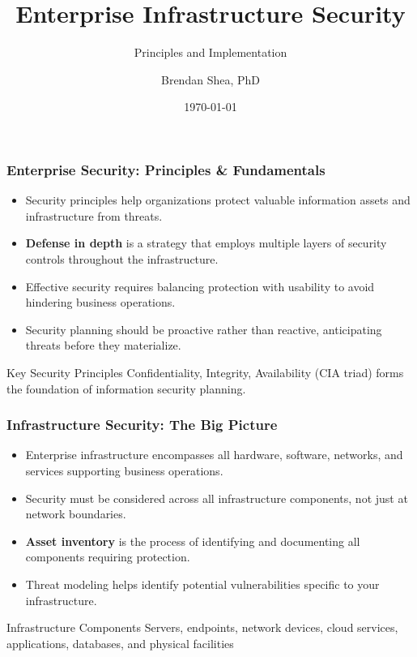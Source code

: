 \documentclass{beamer}
\title{Enterprise Infrastructure Security}
\subtitle{Principles and Implementation}
\author{Brendan Shea, PhD}
\date{\today}
\begin{document}
\begin{frame}
    \titlepage
\end{frame}

\begin{frame}
    \frametitle{Enterprise Security: Principles \& Fundamentals}
    \begin{itemize}
        \item Security principles help organizations protect valuable information assets and infrastructure from threats.
        \item \textbf{Defense in depth} is a strategy that employs multiple layers of security controls throughout the infrastructure.
        \item Effective security requires balancing protection with usability to avoid hindering business operations.
        \item Security planning should be proactive rather than reactive, anticipating threats before they materialize.
    \end{itemize}
    
    \begin{alertblock}{Key Security Principles}
        Confidentiality, Integrity, Availability (CIA triad) forms the foundation of information security planning.
    \end{alertblock}
\end{frame}

\begin{frame}
    \frametitle{Infrastructure Security: The Big Picture}
    \begin{itemize}
        \item Enterprise infrastructure encompasses all hardware, software, networks, and services supporting business operations.
        \item Security must be considered across all infrastructure components, not just at network boundaries.
        \item \textbf{Asset inventory} is the process of identifying and documenting all components requiring protection.
        \item Threat modeling helps identify potential vulnerabilities specific to your infrastructure.
    \end{itemize}
    
    \begin{exampleblock}{Infrastructure Components}
        Servers, endpoints, network devices, cloud services, applications, databases, and physical facilities
    \end{exampleblock}
\end{frame}
\end{document}
